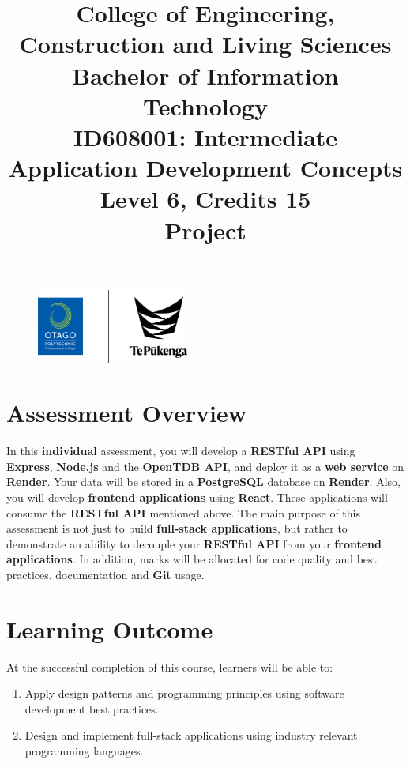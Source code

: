 \documentclass{article}
\author{}
\begin{document}
\begin{figure}
	\centering
	\includegraphics[width=50mm]{../../resources/img/logo.png}
\end{figure}

\title{College of Engineering, Construction and Living Sciences\\Bachelor of Information Technology\\ID608001: Intermediate Application Development Concepts\\Level 6, Credits 15\\\textbf{Project}}
\date{}
\maketitle

\section*{Assessment Overview}
In this \textbf{individual} assessment, you will develop a \textbf{RESTful API} using \textbf{Express}, \textbf{Node.js} and the \textbf{OpenTDB API}, and deploy it as a \textbf{web service} on \textbf{Render}. Your data will be stored in a \textbf{PostgreSQL} database on \textbf{Render}. Also, you will develop \textbf{frontend applications} using \textbf{React}. These applications will consume the \textbf{RESTful API} mentioned above. The main purpose of this assessment is not just to build \textbf{full-stack applications}, but rather to demonstrate an ability to decouple your \textbf{RESTful API} from your \textbf{frontend applications}. In addition, marks will be allocated for code quality and best practices, documentation and \textbf{Git} usage.

\section*{Learning Outcome}
At the successful completion of this course, learners will be able to:
\begin{enumerate}
	\item Apply design patterns and programming principles using software development best practices.
	\item Design and implement full-stack applications using industry relevant programming languages.
\end{enumerate}
\end{document}
